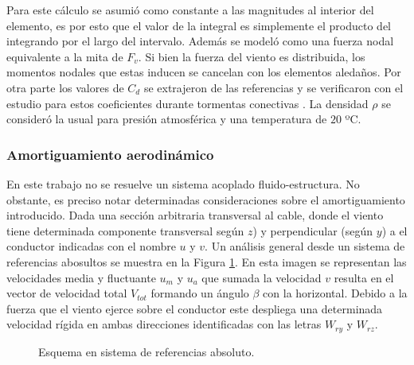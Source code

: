 Para este cálculo se asumió como constante a las magnitudes al interior del elemento, es por esto que el valor de la integral es simplemente el producto del integrando por el largo del intervalo. Además se modeló como una fuerza nodal equivalente a la mita de $F_v$. Si bien la fuerza del viento es distribuida, los momentos nodales que estas inducen se cancelan con los elementos aledaños. Por otra parte los valores de $C_d$ se extrajeron de las referencias \citep{Foti2016} y se verificaron con el estudio para estos coeficientes durante tormentas conectivas \citep{mara2007effects}. La densidad $\rho$ se consideró la usual para presión atmosférica y una temperatura de $20$ ºC.

\subsubsection{Amortiguamiento aerodinámico}
 En este trabajo no se resuelve un sistema acoplado fluido-estructura. No obstante, es preciso notar determinadas consideraciones sobre el amortiguamiento introducido. Dada una sección arbitraria transversal al cable, donde el viento tiene determinada componente transversal según $z$) y perpendicular (según $y$) a el conductor indicadas con el nombre $u$ y $v$. Un análisis general desde un sistema de referencias abosultos se muestra en  la Figura \ref{fig:MET:Viento:VelAbs}. En esta imagen se representan las velocidades media y fluctuante $u_m$ y $u_a$ que sumada la velocidad $v$ resulta en el vector de velocidad total $V_{tot}$ formando un ángulo $\beta$ con la horizontal. Debido a la fuerza que el viento ejerce sobre el conductor este despliega una determinada velocidad rígida en ambas direcciones identificadas con las letras $W_{ry}$ y $W_{rz}$. 
% 

\begin{figure}[htbp]
	\centering
	\def\svgwidth{60mm}
	
	\caption{Esquema en sistema de referencias absoluto.}
	\label{fig:MET:Viento:VelAbs}
\end{figure}

